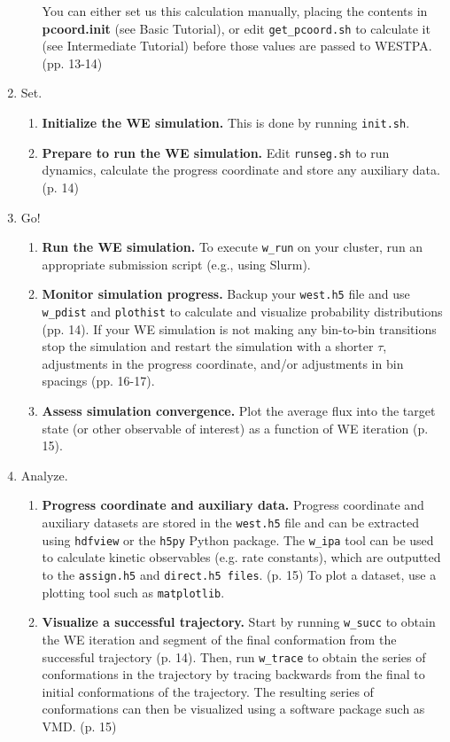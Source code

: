 \documentclass[9pt,tutorial,pubversion]{livecoms}
\begin{document}
\begin{enumerate}
\begin{enumerate}
You can either set us this calculation manually, placing the contents in \textbf{pcoord.init} (see Basic Tutorial), or edit \verb|get_pcoord.sh| to calculate it (see Intermediate Tutorial) before those values are passed to WESTPA. (pp. 13-14)
\end{enumerate}
\item Set.
\begin{enumerate}
\item \textbf{Initialize the WE simulation.}  This is done by running \verb|init.sh|.
\item \textbf{Prepare to run the WE simulation.} Edit \verb|runseg.sh| to run dynamics, calculate the progress coordinate and store any auxiliary data. (p. 14)
\end{enumerate}
\item Go!
\begin{enumerate}
\item \textbf{Run the WE simulation.} 
To execute \verb|w_run| on your cluster, run an appropriate submission script (e.g., using Slurm).
\item \textbf{Monitor simulation progress.}
Backup your \verb|west.h5| file and use \verb|w_pdist| and \verb|plothist| to calculate and visualize probability distributions (pp. 14). 
If your WE simulation is not making any bin-to-bin transitions stop the simulation and restart the simulation with a shorter $\tau$, adjustments in the progress coordinate, and/or adjustments in bin spacings (pp. 16-17). 
\item \textbf{Assess simulation convergence.} 
Plot the average flux into the target state (or other observable of interest) as a function of WE iteration (p. 15).
\end{enumerate}
\item Analyze.
\begin{enumerate}
\item \textbf{Progress coordinate and auxiliary data.} 
Progress coordinate and auxiliary datasets are stored in the \verb|west.h5| file and can be extracted using \verb|hdfview| or the \verb|h5py| Python package. 
The \verb|w_ipa| tool can be used to calculate kinetic observables (e.g. rate constants), which are outputted to the \verb|assign.h5| and \verb|direct.h5 files|. (p. 15) 
To plot a dataset, use a plotting tool such as \verb|matplotlib|.
\item \textbf{Visualize a successful trajectory.}
Start by running \verb|w_succ| to obtain the WE iteration and segment of the final conformation from the successful trajectory (p. 14). 
Then, run \verb|w_trace| to obtain the series of conformations in the trajectory by tracing backwards from the final to initial conformations of the trajectory. 
The resulting series of conformations can then be visualized using a software package such as VMD. (p. 15) 
\end{enumerate}
\end{enumerate}
\end{document}
